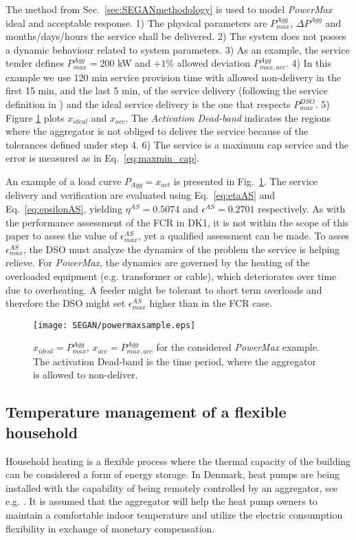 The method from Sec.~\ref{sec:SEGANmethodology} is used to model \textit{PowerMax} ideal and acceptable response. 1) The physical parameters are $P_{max}^{Agg}$, $\Delta P^{Agg}$ and months/days/hours the service shall be delivered. 2) The system does not posses a dynamic behaviour related to system parameters. 3) As an example, the service tender defines $P_{max}^{Agg} = 200$ kW and $+1\%$ allowed deviation $P_{max,acc}^{Agg}$. 4) In this example we use 120 min service provision time with allowed non-delivery in the first 15 min, and the last 5 min, of the service delivery (following the service definition in \cite{ding2013development}) and the ideal service delivery is the one that respects $P_{max}^{DSO}$. 5) Figure \ref{fig:PowerMaxSim} plots $x_{ideal}$ and $x_{acc}$. The \textit{Activation Dead-band} indicates the regions where the aggregator is not obliged to deliver the service because of the tolerances defined under step 4. 6) The service is a maximum cap service and the error is measured as in Eq.~\eqref{eq:maxmin_cap}.

An example of a load curve $P_{Agg}=x_{act}$ is presented in Fig.~\ref{fig:PowerMaxSim}. The service delivery and verification are evaluated using Eq.~\eqref{eq:etaAS} and Eq.~\eqref{eq:epsilonAS}, yielding $\eta^{AS} = 0.5074$ and $\epsilon^{AS} = 0.2701$ respectively. As with the performance assessment of the FCR in DK1, it is not within the scope of this paper to asses the value of $\epsilon^{AS}_{max}$, yet a qualified assessment can be made. %
To asses $\epsilon^{AS}_{max}$, the DSO must analyze the dynamics of the problem the service is helping relieve. For \textit{PowerMax}, the dynamics are governed by the heating of the overloaded equipment (e.g. transformer or cable), which deteriorates over time due to overheating. A feeder might be tolerant to short term overloads and therefore the DSO might set $\epsilon^{AS}_{max}$ higher than in the FCR case.

\begin{figure}
\centering
\texttt{[image: SEGAN/powermaxsample.eps]}
\vspace{-4pt}
\caption{$x_{ideal}=P_{max}^{Agg}$, $x_{acc}=P_{max,acc}^{Agg}$ for the considered \textit{PowerMax} example. The activation Dead-band is the time period, where the aggregator is allowed to non-deliver.}\label{fig:PowerMaxSim}
\end{figure}

\subsection{Temperature management of a flexible household}
Household heating is a flexible process where the thermal capacity of the building can be considered a form of energy storage. In Denmark, heat pumps are being installed with the capability of being remotely controlled by an aggregator, see e.g. \cite{insero}. It is assumed that the aggregator will help the heat pump owners to maintain a comfortable indoor temperature and utilize the electric consumption flexibility in exchange of monetary compensation.

